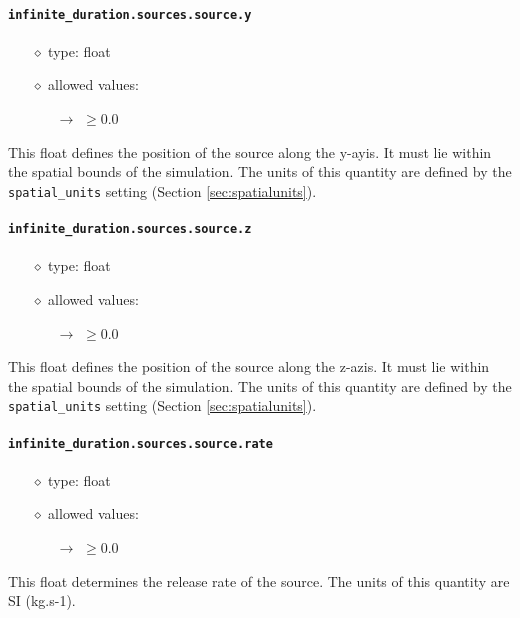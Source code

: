 \documentclass[]{article}
\def\code#1{\texttt{#1}}
\begin{document}
\paragraph{\code{infinite\_duration.sources.source.y}}\label{sec:infsourcey}
\begin{itemize}
    \item[$\diamond$] type: float 
    \item[$\diamond$] allowed values:
    \begin{itemize}
        \item[$\rightarrow$] $\geq0.0$
    \end{itemize}
\end{itemize}
This float defines the position of the source along the y-ayis. It must lie
within the spatial bounds of the simulation. The units of this quantity are
defined by the \code{spatial\_units} setting (Section \ref{sec:spatialunits}).

\paragraph{\code{infinite\_duration.sources.source.z}}\label{sec:infsourcez}
\begin{itemize}
    \item[$\diamond$] type: float 
    \item[$\diamond$] allowed values:
    \begin{itemize}
        \item[$\rightarrow$] $\geq0.0$
    \end{itemize}
\end{itemize}
This float defines the position of the source along the z-azis. It must lie
within the spatial bounds of the simulation. The units of this quantity are
defined by the \code{spatial\_units} setting (Section \ref{sec:spatialunits}).

\paragraph{\code{infinite\_duration.sources.source.rate}}\label{sec:infsourcerate}
\begin{itemize}
    \item[$\diamond$] type: float 
    \item[$\diamond$] allowed values:
    \begin{itemize}
        \item[$\rightarrow$] $\geq0.0$
    \end{itemize}
\end{itemize}
This float determines the release rate of the source. The units of this quantity
are SI (kg.s-1).
\end{document}
